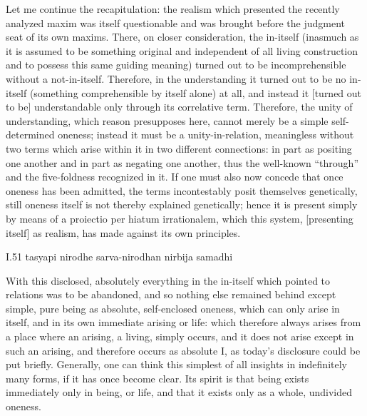 Let me continue the recapitulation:
the realism which presented
the recently analyzed maxim was
itself questionable and was brought before
the judgment seat of its own maxims.
There, on closer consideration, the in-itself
(inasmuch as it is assumed to be something original
and independent of all living construction
and to possess this same guiding meaning)
turned out to be incomprehensible
without a not-in-itself.
Therefore, in the understanding
it turned out to be no in-itself
(something comprehensible by itself alone) at all,
and instead it [turned out to be] understandable
only through its correlative term.
Therefore, the unity of understanding,
which reason presupposes here,
cannot merely be a simple self-determined oneness;
instead it must be a unity-in-relation,
meaningless without two terms
which arise within it in two different connections:
in part as positing one another
and in part as negating one another,
thus the well-known “through” and
the five-foldness recognized in it.
If one must also now concede that
once oneness has been admitted,
the terms incontestably posit themselves genetically,
still oneness itself is not thereby explained genetically;
hence it is present simply by means of
a proiectio per hiatum irrationalem,
which this system, [presenting itself] as realism,
has made against its own principles.

I.51
tasyapi nirodhe sarva-nirodhan nirbija samadhi

With this disclosed, absolutely everything
in the in-itself which pointed to relations
was to be abandoned,
and so nothing else remained behind
except simple, pure being
as absolute, self-enclosed oneness,
which can only arise in itself,
and in its own immediate arising or life:
which therefore always arises
from a place where an arising,
a living, simply occurs, and
it does not arise except in such an arising,
and therefore occurs as absolute I,
as today's disclosure could be put briefly.
Generally, one can think this simplest
of all insights in indefinitely many forms,
if it has once become clear.
Its spirit is that being exists
immediately only in being, or life,
and that it exists only
as a whole, undivided oneness.
